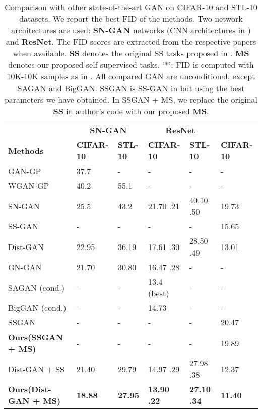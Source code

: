 \documentclass{article}
\begin{document}
\begin{table}
  \small
  \caption{Comparison with other state-of-the-art GAN on CIFAR-10 and STL-10 datasets. 
  We report the best FID of the methods.
  Two network architectures are used: {\bf SN-GAN} networks (CNN architectures in \cite{miyato-iclr-2018}) and {\bf ResNet}.
  The FID scores are extracted from the respective papers when available.
  {\bf SS} denotes the original SS tasks proposed in \cite{chen-arxiv-2018}. {\bf MS} denotes our proposed self-supervised tasks. 
  `*': FID is computed with 10K-10K samples as in \cite{chen-arxiv-2018}. All compared GAN are unconditional, except SAGAN and BigGAN.
  SSGAN is SS-GAN in \cite{chen-arxiv-2018} but using the best parameters we have obtained. 
  In SSGAN + MS, we replace the original {\bf SS} in author's code with our proposed {\bf MS}.}

  \label{state_of_the_art}
  \centering
  \begin{tabular}{llllll}
    \toprule
    & \multicolumn{2}{c}{\textbf{SN-GAN}} & \multicolumn{2}{c}{\textbf{ResNet}} \\
    \cmidrule(r){2-3}  \cmidrule(r){4-6}
    \textbf{Methods}  & \textbf{CIFAR-10}     & \textbf{STL-10}     & \textbf{CIFAR-10}   & \textbf{STL-10}  & \textbf{CIFAR-10}\\
    \midrule
    GAN-GP \cite{miyato-iclr-2018}    			      & 37.7   & -      & - & - & - \\
    WGAN-GP \cite{miyato-iclr-2018}    			      & 40.2   & 55.1   & - & - & - \\
    SN-GAN \cite{miyato-iclr-2018}    			      & 25.5   & 43.2   & 21.70  .21 & 40.10  .50  & 19.73 \\
SS-GAN \cite{chen-arxiv-2018}                     & -      & -      & -               & -               & 15.65 \\
    Dist-GAN \cite{tran-eccv-2018}  			      & 22.95  & 36.19  & 17.61  .30 & 28.50  .49  & 13.01 \\
    GN-GAN \cite{tran-aaai-2018}                      & 21.70  & 30.80  & 16.47  .28 & - & - \\
    \hline
    SAGAN \cite{zhang-arxiv-2018} (cond.)             & -  & -  & 13.4 (best) & - & - \\
    BigGAN \cite{brock-iclr-2018} (cond.)             & -  & -  & 14.73       & - & - \\
    \hline
    SSGAN                                         & -  & -  & -  & -  & 20.47 \\
    \textbf{Ours(SSGAN + MS)}                     & -  & -  & -  & -  & 19.89 \\
    \hline

    Dist-GAN + SS                                     & 21.40  & 29.79 & 14.97  .29 & 27.98  .38 & 12.37 \\ 

    \textbf{Ours(Dist-GAN + MS)}                      & \textbf{18.88}  & \textbf{27.95} & \textbf{13.90  .22} & \textbf{27.10  .34} & \textbf{11.40} \\
    \bottomrule
  \end{tabular}
  \vspace{-0.4cm}
\end{table}
\end{document}
